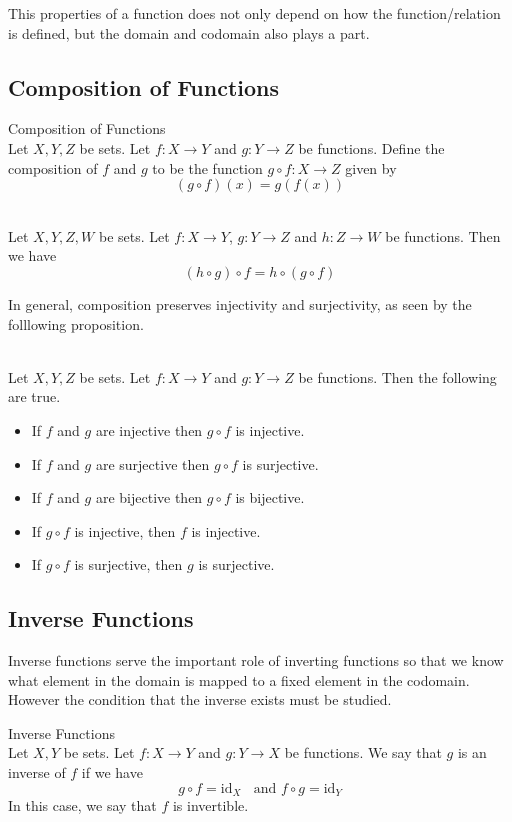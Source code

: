 \documentclass[a4paper]{article}
\begin{document}
This properties of a function does not only depend on how the function/relation is defined, but the domain and codomain also plays a part. 

\subsection{Composition of Functions}
\begin{defn}{Composition of Functions}{}\\
Let $X,Y,Z$ be sets. Let $f:X\to Y$ and $g:Y\to Z$ be functions. Define the composition of $f$ and $g$ to be the function $g\circ f:X\to Z$ given by $$(g\circ f)(x)=g(f(x))$$
\end{defn}

\begin{prp}{}{}\\
Let $X,Y,Z,W$ be sets. Let $f:X\to Y$, $g:Y\to Z$ and $h:Z\to W$ be functions. Then we have $$(h\circ g)\circ f=h\circ(g\circ f)$$
\end{prp}

In general, composition preserves injectivity and surjectivity, as seen by the folllowing proposition. 

\begin{prp}{}{}\\
Let $X,Y,Z$ be sets. Let $f:X\to Y$ and $g:Y\to Z$ be functions. Then the following are true. 
\begin{itemize}
\item If $f$ and $g$ are injective then $g\circ f$ is injective. 
\item If $f$ and $g$ are surjective then $g\circ f$ is surjective. 
\item If $f$ and $g$ are bijective then $g\circ f$ is bijective. 
\item If $g\circ f$ is injective, then $f$ is injective. 
\item If $g\circ f$ is surjective, then $g$ is surjective. 
\end{itemize}
\end{prp}

\subsection{Inverse Functions}
Inverse functions serve the important role of inverting functions so that we know what element in the domain is mapped to a fixed element in the codomain. However the condition that the inverse exists must be studied. 

\begin{defn}{Inverse Functions}{}\\
Let $X,Y$ be sets. Let $f:X\to Y$ and $g:Y\to X$ be functions. We say that $g$ is an inverse of $f$ if we have $$g\circ f=\text{id}_X\;\;\text{ and }f\circ g=\text{id}_Y$$ In this case, we say that $f$ is invertible. 
\end{defn}
\end{document}
